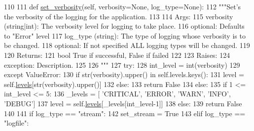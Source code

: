 \begin{DoxyCode}
110 
111     \textcolor{keyword}{def }\hyperlink{classcommotion__client_1_1utils_1_1logger_1_1LogHandler_a3d76d342b09b2d51753751e5f64f48df}{set\_verbosity}(self, verbosity=None, log\_type=None):
112         \textcolor{stringliteral}{"""Set's the verbosity of the logging for the application.}
113 \textcolor{stringliteral}{        }
114 \textcolor{stringliteral}{        Args:}
115 \textcolor{stringliteral}{          verbosity (string|int): The verbosity level for logging to take place.}
116 \textcolor{stringliteral}{            optional: Defaults to "Error" level}
117 \textcolor{stringliteral}{          log\_type (string): The type of logging whose verbosity is to be changed.}
118 \textcolor{stringliteral}{            optional: If not specified ALL logging types will be changed.}
119 \textcolor{stringliteral}{        }
120 \textcolor{stringliteral}{        Returns:}
121 \textcolor{stringliteral}{          bool True if successful, False if failed}
122 \textcolor{stringliteral}{        }
123 \textcolor{stringliteral}{        Raises:}
124 \textcolor{stringliteral}{        exception: Description.}
125 \textcolor{stringliteral}{        }
126 \textcolor{stringliteral}{        """}
127         \textcolor{keywordflow}{try}:
128             int\_level = int(verbosity)
129         \textcolor{keywordflow}{except} ValueError:
130             \textcolor{keywordflow}{if} str(verbosity).upper() \textcolor{keywordflow}{in} self.levels.keys():
131                 level = self.\hyperlink{classcommotion__client_1_1utils_1_1logger_1_1LogHandler_a0e8bffd460ab94f0e05bdc8a676d2c4f}{levels}[str(verbosity).upper()]
132             \textcolor{keywordflow}{else}:
133                 \textcolor{keywordflow}{return} \textcolor{keyword}{False}
134         \textcolor{keywordflow}{else}:
135             \textcolor{keywordflow}{if} 1 <= int\_level <= 5:
136                 \_levels = [ \textcolor{stringliteral}{'CRITICAL'}, \textcolor{stringliteral}{'ERROR'}, \textcolor{stringliteral}{'WARN'}, \textcolor{stringliteral}{'INFO'}, \textcolor{stringliteral}{'DEBUG'}]
137                 level = self.\hyperlink{classcommotion__client_1_1utils_1_1logger_1_1LogHandler_a0e8bffd460ab94f0e05bdc8a676d2c4f}{levels}[\_levels[int\_level-1]]
138             \textcolor{keywordflow}{else}:
139                 \textcolor{keywordflow}{return} \textcolor{keyword}{False}
140                 
141         \textcolor{keywordflow}{if} log\_type == \textcolor{stringliteral}{"stream"}:
142             set\_stream = \textcolor{keyword}{True}
143         \textcolor{keywordflow}{elif} log\_type == \textcolor{stringliteral}{"logfile"}:

\end{DoxyCode}
